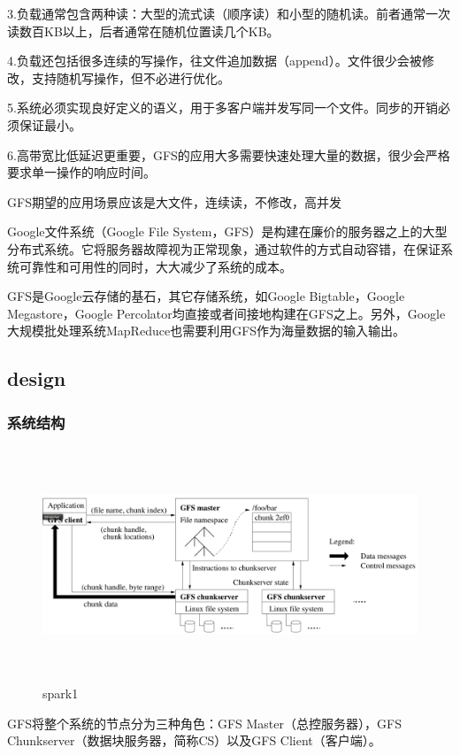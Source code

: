 3.负载通常包含两种读：大型的流式读（顺序读）和小型的随机读。前者通常一次读数百KB以上，后者通常在随机位置读几个KB。

4.负载还包括很多连续的写操作，往文件追加数据（append）。文件很少会被修改，支持随机写操作，但不必进行优化。

5.系统必须实现良好定义的语义，用于多客户端并发写同一个文件。同步的开销必须保证最小。

6.高带宽比低延迟更重要，GFS的应用大多需要快速处理大量的数据，很少会严格要求单一操作的响应时间。

{\color{red}GFS期望的应用场景应该是大文件，连续读，不修改，高并发}

Google文件系统（Google File System，GFS）是构建在廉价的服务器之上的大型分布式系统。它将服务器故障视为正常现象，通过软件的方式自动容错，在保证系统可靠性和可用性的同时，大大减少了系统的成本。

GFS是Google云存储的基石，其它存储系统，如Google Bigtable，Google Megastore，Google Percolator均直接或者间接地构建在GFS之上。另外，Google大规模批处理系统MapReduce也需要利用GFS作为海量数据的输入输出。

\subsection{design}
\subsubsection{系统结构}
\begin{figure}[!ht]
    \centering
    \includegraphics[height=7cm,width= 15cm]{img/gfs.png}
    \caption{spark1}
\label{spark1}
\end{figure}

GFS将整个系统的节点分为三种角色：GFS Master（总控服务器），GFS Chunkserver（数据块服务器，简称CS）以及GFS Client（客户端）。

